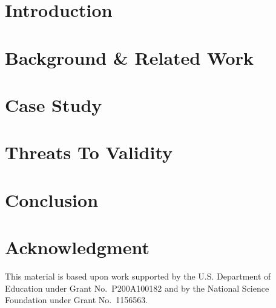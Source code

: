 \documentclass[conference]{IEEEtran}
\begin{document}
\section{Introduction}
\label{sec:intro}


\section{Background \& Related Work}
\label{sec:related}


\section{Case Study}
\label{sec:study}


\section{Threats To Validity}
\label{sec:threats}


\section{Conclusion}
\label{sec:conclusion}


\section*{Acknowledgment}
This material is based upon work supported
by the U.S. Department of Education under Grant No.\ P200A100182 and
by the National Science Foundation under Grant No.\ 1156563.



\end{document}
